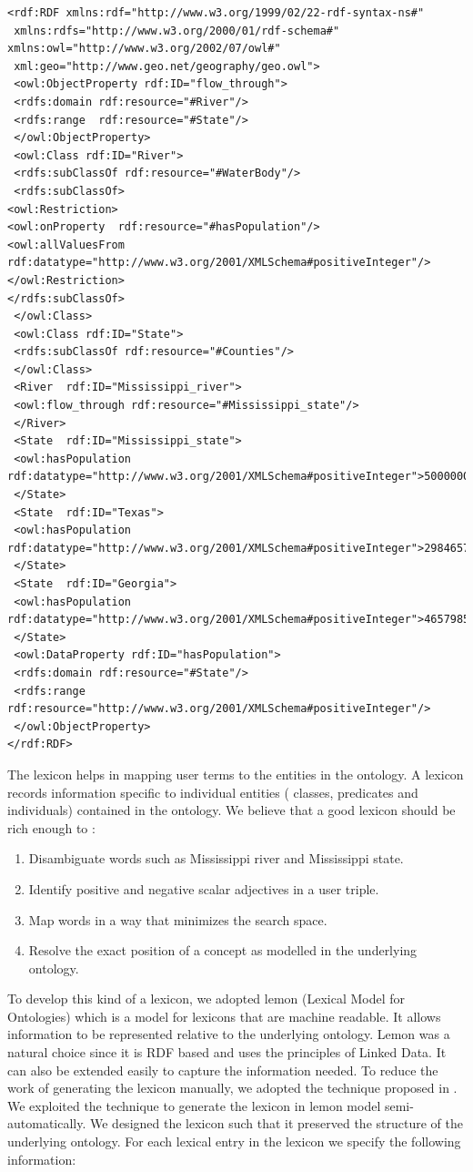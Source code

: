 \documentclass[review]{elsarticle}
\begin{document}
\begin{lstlisting}[caption= Sample ontology]
 <rdf:RDF xmlns:rdf="http://www.w3.org/1999/02/22-rdf-syntax-ns#"
 xmlns:rdfs="http://www.w3.org/2000/01/rdf-schema#"
xmlns:owl="http://www.w3.org/2002/07/owl#"
 xml:geo="http://www.geo.net/geography/geo.owl">
 <owl:ObjectProperty rdf:ID="flow_through">
 <rdfs:domain rdf:resource="#River"/>
 <rdfs:range  rdf:resource="#State"/>
 </owl:ObjectProperty>
 <owl:Class rdf:ID="River">
 <rdfs:subClassOf rdf:resource="#WaterBody"/>
 <rdfs:subClassOf>
<owl:Restriction>
<owl:onProperty  rdf:resource="#hasPopulation"/>
<owl:allValuesFrom rdf:datatype="http://www.w3.org/2001/XMLSchema#positiveInteger"/>
</owl:Restriction>
</rdfs:subClassOf>
 </owl:Class>
 <owl:Class rdf:ID="State">
 <rdfs:subClassOf rdf:resource="#Counties"/>
 </owl:Class>
 <River  rdf:ID="Mississippi_river">
 <owl:flow_through rdf:resource="#Mississippi_state"/>
 </River>
 <State  rdf:ID="Mississippi_state">
 <owl:hasPopulation rdf:datatype="http://www.w3.org/2001/XMLSchema#positiveInteger">50000000</owl:hasPopulation>
 </State>
 <State  rdf:ID="Texas">
 <owl:hasPopulation rdf:datatype="http://www.w3.org/2001/XMLSchema#positiveInteger">298465775</owl:hasPopulation>
 </State>
 <State  rdf:ID="Georgia">
 <owl:hasPopulation rdf:datatype="http://www.w3.org/2001/XMLSchema#positiveInteger">4657985</owl:hasPopulation>
 </State>
 <owl:DataProperty rdf:ID="hasPopulation">
 <rdfs:domain rdf:resource="#State"/>
 <rdfs:range  rdf:resource="http://www.w3.org/2001/XMLSchema#positiveInteger"/>
 </owl:ObjectProperty>
</rdf:RDF>
\end{lstlisting}
The lexicon helps in mapping user terms to the entities in the ontology. A lexicon records information specific to individual entities ( classes, predicates and individuals) contained in the ontology. We believe that a good lexicon should be rich enough to :
\begin{enumerate}
\item Disambiguate words such as Mississippi river and Mississippi state.
\item Identify positive and negative scalar adjectives in a user triple.
\item Map words in a way that minimizes the search space.
\item Resolve the exact position of a concept as modelled in the underlying ontology.
\end{enumerate}
To develop this kind of a lexicon, we adopted lemon (Lexical Model for Ontologies) \citep{john2011} which is a model for lexicons that are machine readable. It allows information to be represented relative to the underlying ontology. Lemon was a natural  choice  since it is RDF based and uses the principles of Linked Data. It can  also be extended  easily to capture the information  needed.  To reduce the work of generating the lexicon manually,  we adopted the technique proposed in \citep{walter2013}.  We exploited the technique to generate the lexicon in lemon model  semi-automatically.  We designed the lexicon such that it preserved  the structure of the underlying ontology. For each lexical entry in the lexicon we specify the following information:
\end{document}
